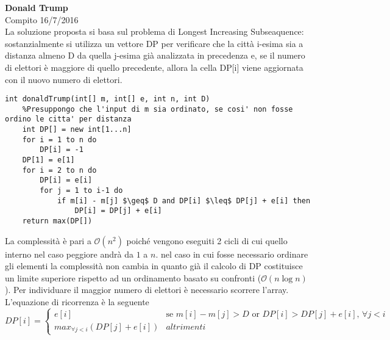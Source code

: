 \documentclass[../cheatSheetAlgoritmi.tex]{subfiles}
\begin{document}
\bigskip
\textbf{Donald Trump}\\
Compito 16/7/2016\\
La soluzione proposta si basa sul problema di Longest Increasing Subseaquence: sostanzialmente si utilizza un vettore DP per verificare che la città i-esima sia a distanza almeno D da quella j-esima già analizzata in precedenza e, se il numero di elettori è maggiore di quello precedente, allora la cella DP[i] viene aggiornata con il nuovo numero di elettori.
\begin{lstlisting}[caption=Donald Trump]
int donaldTrump(int[] m, int[] e, int n, int D)
	%Presuppongo che l'input di m sia ordinato, se cosi' non fosse ordino le citta' per distanza
	int DP[] = new int[1...n]
	for i = 1 to n do
		DP[i] = -1
	DP[1] = e[1]
	for i = 2 to n do
		DP[i] = e[i]
		for j = 1 to i-1 do
			if m[i] - m[j] $\geq$ D and DP[i] $\leq$ DP[j] + e[i] then
				DP[i] = DP[j] + e[i]
	return max(DP[])
\end{lstlisting}
La complessità è pari a $\mathcal{O}(n^{2})$ poiché vengono eseguiti 2 cicli di cui quello interno nel caso peggiore andrà da $1$ a $n$. nel caso in cui fosse necessario ordinare gli elementi la complessità non cambia in quanto già il calcolo di DP costituisce un limite superiore rispetto ad un ordinamento basato su confronti ($\mathcal{O}(n\log{n})$). Per individuare il maggior numero di elettori è necessario scorrere l'array.\\
L'equazione di ricorrenza è la seguente
\begin{equation*}
  	DP[i] =\begin{cases}
    	e[i] & \text{se $m[i] - m[j] > D$ or $DP[i] > DP[j] + e[i]$, $\forall j < i$ }\\
    	max_{\forall j < i} (DP[j] + e[i]) & \text{$altrimenti$}
  	\end{cases}
\end{equation*}
 
\end{document}
